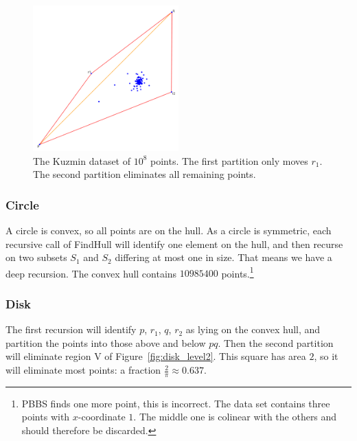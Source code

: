 \begin{figure}[ht]
    \centering
    \includegraphics[width=0.5\textwidth]{./figures/rust-kuzmin.png}
    \caption{The Kuzmin dataset of $10^8$ points. The first partition only
             moves $r_1$. The second partition eliminates all remaining points.}
    \label{fig:kuzmin}
\end{figure}

\subsubsection{Circle}

A circle is convex, so all points are on the hull. As a circle is symmetric,
each recursive call of FindHull will identify one element on the hull, and
then recurse on two subsets $S_1$ and $S_2$ differing at most one in size.
That means we have a deep recursion. The convex hull contains $10985400$
points.\footnote{PBBS finds one more point, this is incorrect. The data set
contains three points with $x$-coordinate $1$. The middle one is colinear
with the others and should therefore be discarded.}

\subsubsection{Disk}

The first recursion will identify $p$, $r_1$, $q$, $r_2$ as lying on the
convex hull, and partition the points into those above and below $pq$.
Then the second partition will eliminate region V of 
Figure~\ref{fig:disk_level2}. This square has area $2$, so it will eliminate
most points: a fraction $\frac{2}{\pi} \approx 0.637$.

